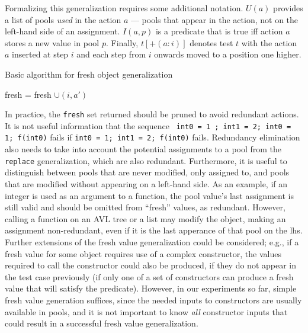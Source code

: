 Formalizing this generalization requires some additional notation.
$U(a)$ provides a list of pools \emph{used} in the action $a$ --- pools that
appear in the action, not on the left-hand side of an assignment.
$I(a,p)$ is a predicate that is true iff action $a$ stores a new value
in pool $p$.  Finally, $t[+(a: i)]$ denotes test $t$ with the action
$a$ inserted at step $i$ and each step from $i$ onwards moved to a
position one higher.

\begin{algorithm}
\caption{Basic algorithm for fresh object generalization}
\label{freshalg}
\begin{algorithmic}[1]
\State fresh = fresh $\cup (i,a')$
\EndIf
\EndFor 
\EndFor
\EndFor
{}
\end{algorithmic}
\end{algorithm}

In practice, the {\tt fresh} set returned should be pruned to avoid
redundant actions.  It is not useful information that the sequence {\tt
  int0 = 1 ; int1 = 2; int0 = 1; f(int0)} fails if {\tt int0 = 1; int1
  = 2; f(int0)} fails.  Redundancy elimination also needs to take into
account the potential assignments to a pool from the {\tt replace}
generalization, which are also redundant.  Furthermore, it is useful
to distinguish between pools that are never modified, only assigned
to, and pools that are modified without appearing on a left-hand
side.  As an example, if an integer is used as an argument to a
function, the pool value's last assignment is still valid and should
be omitted from ``fresh'' values, as redundant.  However, calling a
function on an AVL tree or a list may modify the object, making an
assignment non-redundant, even if it is the last apperance of that
pool on the lhs.  Further extensions of the fresh value generalization
could be considered; e.g., if a fresh value for some object requires use
of a complex constructor, the values required to call the constructor
could also be produced, if they do not appear in the test case
previously (if only one of a set of constructors can produce a fresh
value that will satisfy the predicate).  However, in our experiments
so far, simple fresh value generation suffices, since the needed
inputs to constructors are usually available in pools, and it is not
important to know \emph{all} constructor inputs that could result in a
successful fresh value generalization.

